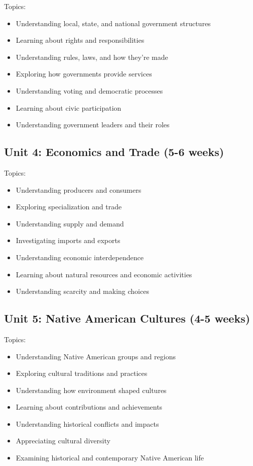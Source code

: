 \documentclass[11pt,letterpaper]{report}
\begin{document}
Topics:
\begin{itemize}
\item Understanding local, state, and national government structures
\item Learning about rights and responsibilities
\item Understanding rules, laws, and how they're made
\item Exploring how governments provide services
\item Understanding voting and democratic processes
\item Learning about civic participation
\item Understanding government leaders and their roles
\end{itemize}

\subsection{Unit 4: Economics and Trade (5-6 weeks)}

Topics:
\begin{itemize}
\item Understanding producers and consumers
\item Exploring specialization and trade
\item Understanding supply and demand
\item Investigating imports and exports
\item Understanding economic interdependence
\item Learning about natural resources and economic activities
\item Understanding scarcity and making choices
\end{itemize}

\subsection{Unit 5: Native American Cultures (4-5 weeks)}

Topics:
\begin{itemize}
\item Understanding Native American groups and regions
\item Exploring cultural traditions and practices
\item Understanding how environment shaped cultures
\item Learning about contributions and achievements
\item Understanding historical conflicts and impacts
\item Appreciating cultural diversity
\item Examining historical and contemporary Native American life
\end{itemize}
\end{document}
